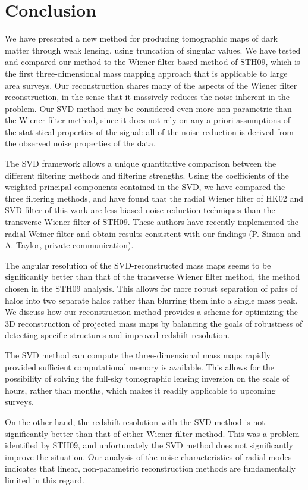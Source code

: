 \section{Conclusion}
\label{Conclusions}

We have presented a new method for producing tomographic maps of dark matter
through weak lensing, using truncation of singular values.  We have
tested and compared our method to the Wiener filter based
method of STH09, which is the first three-dimensional mass mapping
approach that is applicable to large area surveys. Our reconstruction
shares many of the aspects of the Wiener filter reconstruction,
in the sense that it massively reduces the noise inherent in the problem.
Our SVD method may be considered even more non-parametric
than the Wiener filter method, since it does not rely on any a priori 
assumptions of the statistical properties of the signal: all of the noise 
reduction is derived from the observed noise properties of the data.

The SVD framework allows a unique quantitative comparison between the
different filtering methods and filtering strengths.  Using the
coefficients of the weighted principal components contained in the SVD,
we have compared the three filtering methods, and have found that 
the radial Wiener filter of HK02 and SVD filter of this work are 
less-biased noise reduction techniques than the transverse Wiener filter
of STH09.  These authors have recently implemented the radial Weiner 
filter and obtain results consistent with our findings (P. Simon and 
A. Taylor, private communication).

The angular resolution of the SVD-reconstructed mass maps seems to 
be significantly better than that of the transverse Wiener filter method,
the method chosen in the STH09 analysis.
This allows for more robust separation of pairs of halos into two 
separate halos rather than blurring them into a single mass peak.  
We discuss how our reconstruction method provides a scheme for
optimizing the 3D reconstruction of projected mass maps by
balancing the goals of robustness of detecting specific structures
and improved redshift resolution. 

The SVD method can compute the three-dimensional mass maps
rapidly provided sufficient computational memory is available. 
This allows for the possibility of solving the full-sky tomographic
lensing inversion on the scale of hours, rather than months, which
makes it readily applicable to upcoming surveys. 

On the other hand, the redshift resolution with the SVD method is not
significantly  better than that of either Wiener filter method.  
This was a problem identified by STH09, and unfortunately
the SVD method does not significantly improve the situation. 
Our analysis of the noise characteristics of radial modes 
indicates that linear, non-parametric reconstruction methods are
fundamentally limited in this regard.
